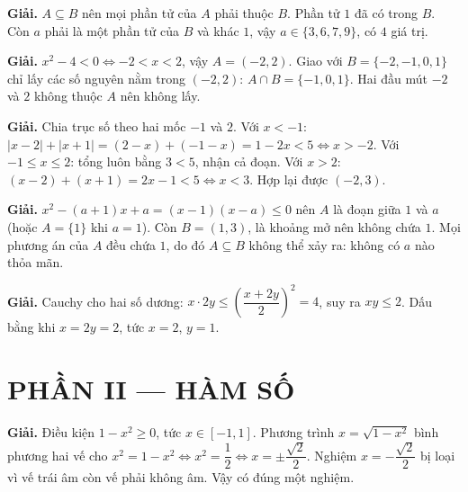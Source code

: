 \documentclass[11pt, a4paper]{article}
\begin{document}
\begin{dapan}[1 — Đáp án C]

\textbf{Giải.} $A\subseteq B$ nên mọi phần tử của $A$ phải thuộc $B$. Phần tử $1$ đã có trong $B$. Còn $a$ phải là một phần tử của $B$ và khác $1$, vậy $a\in\{3,6,7,9\}$, có $4$ giá trị.


\end{dapan}
\vspace{0.3cm}
\begin{dapan}[2 — Đáp án B]

\textbf{Giải.} $x^2-4<0 \iff -2<x<2$, vậy $A=(-2,2)$. Giao với $B=\{-2,-1,0,1\}$ chỉ lấy các số nguyên nằm trong $(-2,2)$: $A\cap B=\{-1,0,1\}$. Hai đầu mút $-2$ và $2$ không thuộc $A$ nên không lấy.


\end{dapan}
\vspace{0.3cm}
\begin{dapan}[3 — Đáp án C]

\textbf{Giải.} Chia trục số theo hai mốc $-1$ và $2$. Với $x<-1$: $|x-2|+|x+1|=(2-x)+(-1-x)=1-2x<5 \iff x>-2$. Với $-1\le x\le2$: tổng luôn bằng $3<5$, nhận cả đoạn. Với $x>2$: $(x-2)+(x+1)=2x-1<5 \iff x<3$. Hợp lại được $(-2,3)$.


\end{dapan}
\vspace{0.3cm}
\begin{dapan}[4 — Đáp án A]

\textbf{Giải.} $x^2-(a+1)x+a=(x-1)(x-a)\le0$ nên $A$ là đoạn giữa $1$ và $a$ (hoặc $A=\{1\}$ khi $a=1$). Còn $B=(1,3)$, là khoảng mở nên không chứa $1$. Mọi phương án của $A$ đều chứa $1$, do đó $A\subseteq B$ không thể xảy ra: không có $a$ nào thỏa mãn.


\end{dapan}
\vspace{0.3cm}
\begin{dapan}[5 — Đáp án A]

\textbf{Giải.} Cauchy cho hai số dương: $x\cdot 2y\le\left(\dfrac{x+2y}{2}\right)^2=4$, suy ra $xy\le2$. Dấu bằng khi $x=2y=2$, tức $x=2$, $y=1$.

\section{PHẦN II — HÀM SỐ}


\end{dapan}
\vspace{0.3cm}
\begin{dapan}[6 — Đáp án B]

\textbf{Giải.} Điều kiện $1-x^2\ge0$, tức $x\in[-1,1]$. Phương trình $x=\sqrt{1-x^2}$ bình phương hai vế cho $x^2=1-x^2 \iff x^2=\dfrac{1}{2} \iff x=\pm\dfrac{\sqrt{2}}{2}$. Nghiệm $x=-\dfrac{\sqrt{2}}{2}$ bị loại vì vế trái âm còn vế phải không âm. Vậy có đúng một nghiệm.


\end{dapan}
\end{document}
